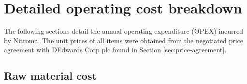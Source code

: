 \section{Detailed operating cost breakdown}
The following sections detail the annual operating expenditure (OPEX) incurred by Nitroma. The unit prices of all items were obtained from the negotiated price agreement with DEdwards Corp plc found in Section \ref{sec:price-agreement}.

\subsection{Raw material cost}
\label{sec:opex-raw-material}

